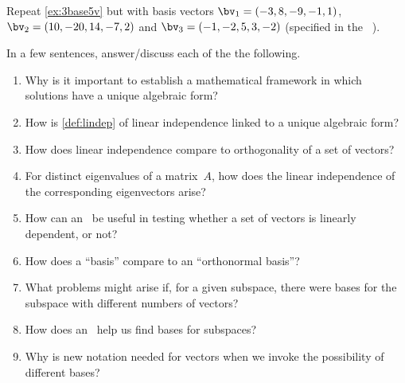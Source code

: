 \begin{exercise} \label{ex:} 
Repeat \autoref{ex:3base5v} but with basis vectors \(\bv_1=(-3,8,-9,-1,1)\), \(\bv_2=(10,-20,14,-7,2)\) and \(\bv_3=(-1,-2,5,3,-2)\) (specified in the ~\cE).
\setbox\ajrqrbox\hbox{}\marginpar{\usebox{\ajrqrbox}}
\end{exercise}




\begin{exercise} 
In a few sentences, answer\slash discuss each of the the following.
\begin{enumerate}
\item  Why is it important to establish a mathematical framework in which solutions have a unique algebraic form?

\item How is \autoref{def:lindep} of linear independence linked to a unique algebraic form?

\item How does linear independence compare to orthogonality of a set of vectors?

\item For distinct eigenvalues of a matrix~\(A\), how does the linear independence of the corresponding eigenvectors arise?

\item How can an \svd\ be useful in testing whether a set of vectors is linearly dependent, or not?

\item How does a ``basis'' compare to an ``orthonormal basis''?

\item What problems might arise if, for a given subspace, there were bases for the subspace with different numbers of vectors?

\item How does an \svd\ help us find bases for subspaces?

\item Why is new notation needed for vectors when we invoke the possibility of different bases?

\end{enumerate}
\end{exercise}

\begin{comment}%
why, what caused X?
how did X occur?
what-if? what-if-not?
how does X compare with Y?
what is the evidence for X?
why is X important?
\end{comment}






